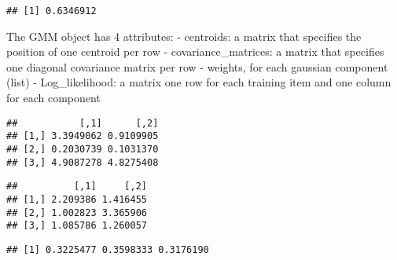 \documentclass[
]{article}
\newenvironment{Shaded}{\begin{snugshade}}{\end{snugshade}}
\newcommand{\FunctionTok}[1]{\textcolor[rgb]{0.00,0.00,0.00}{#1}}
\newcommand{\NormalTok}[1]{#1}
\newcommand{\SpecialCharTok}[1]{\textcolor[rgb]{0.00,0.00,0.00}{#1}}
\begin{document}
\begin{verbatim}
## [1] 0.6346912
\end{verbatim}

The GMM object has 4 attributes: - centroids: a matrix that specifies
the position of one centroid per row - covariance\_matrices: a matrix
that specifies one diagonal covariance matrix per row - weights, for
each gaussian component (list) - Log\_likelihood: a matrix one row for
each training item and one column for each component

\begin{Shaded}
\end{Shaded}

\begin{verbatim}
##           [,1]      [,2]
## [1,] 3.3949062 0.9109905
## [2,] 0.2030739 0.1031370
## [3,] 4.9087278 4.8275408
\end{verbatim}

\begin{Shaded}
\end{Shaded}

\begin{verbatim}
##          [,1]     [,2]
## [1,] 2.209386 1.416455
## [2,] 1.002823 3.365906
## [3,] 1.085786 1.260057
\end{verbatim}

\begin{Shaded}
\end{Shaded}

\begin{verbatim}
## [1] 0.3225477 0.3598333 0.3176190
\end{verbatim}

\begin{Shaded}
\end{Shaded}
\end{document}
